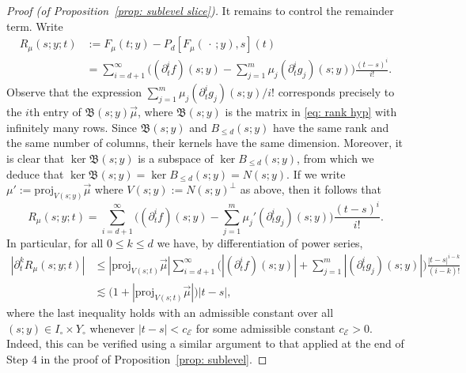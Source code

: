 \documentclass[reqno]{amsart}
\numberwithin{equation}{section}
\newcommand{\sE}{\mathscr{E}}
\newcommand{\fB}{\mathfrak{B}}
\theoremstyle{plain}
\theoremstyle{definition}
\newcommand{\proj}{\mathrm{proj}}
\begin{document}
\begin{proof}[Proof (of Proposition~\ref{prop: sublevel slice})]
It remains to control the remainder term. Write
\begin{align*}
    R_{\mu}(s;y;t) &:= F_{\mu}(t;y) - P_d[F_{\mu}(\,\cdot\,;y),s](t) \\
    &= \sum_{i=d+1}^{\infty} \Big((\partial_t^i f)(s;y) - \sum_{j=1}^m \mu_j (\partial_t^i g_j)(s;y)\Big)\frac{(t-s)^i}{i!}. 
\end{align*}
Observe that the expression $\sum_{j=1}^m \mu_j (\partial_t^i g_j)(s;y)/i!$ corresponds precisely to the $i$th entry of $\fB(s;y)\vec{\mu}$, where $\fB(s;y)$ is the matrix in \eqref{eq: rank hyp} with infinitely many rows. Since $\fB(s;y)$ and $B_{\le d}(s;y)$ have the same rank and the same number of columns, their kernels have the same dimension. Moreover, it is clear that $\ker \fB(s;y)$ is a subspace of $\ker B_{\le d}(s;y)$, from which we deduce that $\ker \fB(s;y) = \ker B_{\le d}(s;y) = N(s;y)$. If we write $\mu' := \proj_{V(s;y)}\vec{\mu}$ where $V(s;y) := N(s;y)^{\perp}$ as above, then it follows that
\begin{equation*}
    R_{\mu}(s;y;t) = \sum_{i=d+1}^{\infty} \Big((\partial_t^i f)(s;y) - \sum_{j=1}^m \mu_j' (\partial_t^i g_j)(s;y)\Big)\frac{(t-s)^i}{i!}. 
\end{equation*}
In particular, for all $0 \leq k \leq d$ we have, by differentiation of power series,
\begin{align}
\nonumber
   |\partial^k_t R_{\mu}(s;y;t)| &\leq |\proj_{V(s;t)}\vec{\mu}| \sum_{i=d+1}^{\infty} \Big(|(\partial_t^i f)(s;y)| + \sum_{j=1}^m  |(\partial_t^i g_j)(s;y)|\Big)\frac{|t-s|^{i-k}}{(i-k)!} \\
   \label{eq: error bound}
   &\lesssim \big(1 + |\proj_{V(s;t)}\vec{\mu}|\big)|t-s|,
\end{align}
where the last inequality holds with an admissible constant over all $(s;y) \in I_{\circ} \times Y_{\circ}$ whenever $|t-s| < c_{\sE}$ for some admissible constant $c_{\sE} > 0$. Indeed, this can be verified using a similar argument to that applied at the end of Step 4 in the proof of Proposition~\ref{prop: sublevel}.


\end{proof}
\end{document}
